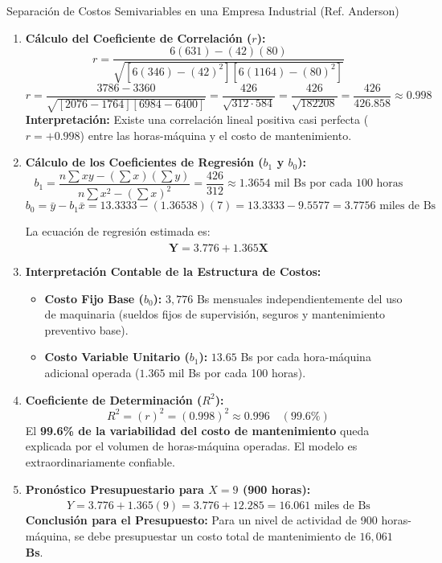 \begin{casocontable}{Separación de Costos Semivariables en una Empresa Industrial (Ref. Anderson)}
\begin{enumerate}
    \item \textbf{Cálculo del Coeficiente de Correlación ($r$):}
    \[
    r = \frac{6(631) - (42)(80)}{\sqrt{\left[ 6(346) - (42)^2 \right] \left[ 6(1164) - (80)^2 \right]}}
    \]
    \[
    r = \frac{3786 - 3360}{\sqrt{\left[ 2076 - 1764 \right] \left[ 6984 - 6400 \right]}} = \frac{426}{\sqrt{312 \cdot 584}} = \frac{426}{\sqrt{182208}} = \frac{426}{426.858} \approx 0.998
    \]
    \textbf{Interpretación:} Existe una correlación lineal positiva casi perfecta ($r = +0.998$) entre las horas-máquina y el costo de mantenimiento.
    
    \item \textbf{Cálculo de los Coeficientes de Regresión ($b_1$ y $b_0$):}
    \[
    b_1 = \frac{n \sum xy - (\sum x)(\sum y)}{n \sum x^2 - (\sum x)^2} = \frac{426}{312} \approx 1.3654 \text{ mil Bs por cada 100 horas}
    \]
    \[
    b_0 = \bar{y} - b_1 \bar{x} = 13.3333 - (1.36538)(7) = 13.3333 - 9.5577 = 3.7756 \text{ miles de Bs}
    \]
    
    La ecuación de regresión estimada es:
    \[
    \mathbf{\hat{Y} = 3.776 + 1.365 X}
    \]
    
    \item \textbf{Interpretación Contable de la Estructura de Costos:}
    \begin{itemize}
        \item \textbf{Costo Fijo Base ($b_0$):} $3{,}776$ Bs mensuales independientemente del uso de maquinaria (sueldos fijos de supervisión, seguros y mantenimiento preventivo base).
        \item \textbf{Costo Variable Unitario ($b_1$):} $13.65$ Bs por cada hora-máquina adicional operada ($1.365$ mil Bs por cada 100 horas).
    \end{itemize}
    
    \item \textbf{Coeficiente de Determinación ($R^2$):}
    \[
    R^2 = (r)^2 = (0.998)^2 \approx 0.996 \quad (99.6\%)
    \]
    El \textbf{99.6\% de la variabilidad del costo de mantenimiento} queda explicada por el volumen de horas-máquina operadas. El modelo es extraordinariamente confiable.
    
    \item \textbf{Pronóstico Presupuestario para $X = 9$ (900 horas):}
    \[
    \hat{Y} = 3.776 + 1.365(9) = 3.776 + 12.285 = 16.061 \text{ miles de Bs}
    \]
    \textbf{Conclusión para el Presupuesto:} Para un nivel de actividad de 900 horas-máquina, se debe presupuestar un costo total de mantenimiento de \textbf{$16{,}061$ Bs}.
\end{enumerate}
\end{casocontable}

